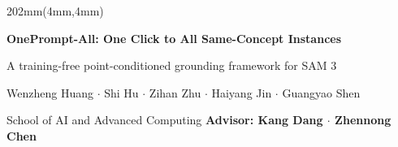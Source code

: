 \documentclass[11pt,a4paper]{article}
\begin{document}
\thispagestyle{empty}

\begin{textblock*}{202mm}(4mm,4mm)

\begin{tcolorbox}[
  enhanced,
  height=23mm,
  valign=center,
  colback=white,
  colframe=Line,
  boxrule=.45pt,
  arc=1.4mm,
  left=2mm,
  right=2mm,
  top=.8mm,
  bottom=.8mm
]

\centering

{\sffamily
\fontsize{22.5}{22.8}\selectfont
\bfseries
OnePrompt-All: One Click to All Same-Concept Instances
}\par

\vspace{.45mm}

{\sffamily
\fontsize{12.5}{13.1}\selectfont
A training-free point-conditioned grounding framework for SAM 3
}\par

\vspace{.4mm}

{\sffamily\fontsize{10.8}{11.4}\selectfont
Wenzheng Huang
\quad $\cdot$ \quad
Shi Hu
\quad $\cdot$ \quad
Zihan Zhu
\quad $\cdot$ \quad
Haiyang Jin
\quad $\cdot$ \quad
Guangyao Shen
}\par

\vspace{.22mm}

{\sffamily\fontsize{10.3}{10.9}\selectfont\color{Muted}
School of AI and Advanced Computing
\hspace{2.2mm}\textbar\hspace{2.2mm}
\textbf{\color{Ink}Advisor: Kang Dang \quad $\cdot$ \quad Zhennong Chen}
}

\end{tcolorbox}

\end{textblock*}
\end{document}

